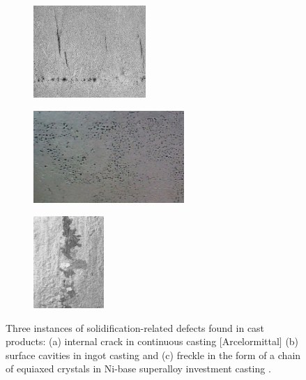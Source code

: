 %
\begin{figure}[htbp]
\centering
  \begin{subfigure}[t]{0.3\textwidth}
    \centering
	\includegraphics[height=3.5cm]{Chapter1/Graphics/cracks.png}
	\caption{}
    \label{fig:crack}
  \end{subfigure}
   \begin{subfigure}[t]{0.35\textwidth}
    \centering
	\includegraphics[height=3.5cm]{Chapter1/Graphics/porosity5.jpg}
	\caption{}
    \label{fig:porosity}
  \end{subfigure}
   \begin{subfigure}[t]{0.3\textwidth}
    \centering
	\includegraphics[height=3.5cm]{Chapter1/Graphics/freckle4.png} 
	\caption{}
    \label{fig:freckle}
  \end{subfigure}
\caption{Three instances of solidification-related defects found in cast products: 
(a) internal crack in continuous casting [Arcelormittal] (b) surface cavities in ingot casting \citep{carlson_modeling_2002}  
and (c) freckle in the form of a chain of equiaxed crystals in Ni-base superalloy investment casting \citep{giamei_nature_1970}.}
\label{fig:casting}
\end{figure}

